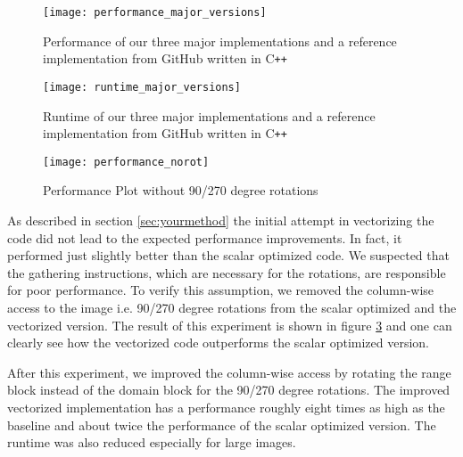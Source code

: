 \begin{figure}[H]
  \centering
  \texttt{[image: performance\_major\_versions]}
  \caption{Performance of our three major implementations and a reference
    implementation from GitHub written in C\texttt{++}}\label{fig:perf}
\end{figure}

\begin{figure}[H]
  \centering
  \texttt{[image: runtime\_major\_versions]}
  \caption{Runtime of our three major implementations and a reference
    implementation from GitHub written in C\texttt{++}}\label{fig:runtime}
\end{figure}

\begin{figure}[t]
  \centering
  \texttt{[image: performance\_norot]}
  \caption{Performance Plot without 90/270 degree rotations}\label{fig:perf_40_41}
\end{figure}

As described in section \ref{sec:yourmethod} the initial attempt in vectorizing
the code did not lead to the expected performance improvements. In fact, it
performed just slightly better than the scalar optimized code. We suspected that
the gathering instructions, which are necessary for the rotations, are
responsible for poor performance. To verify this assumption, we removed the
column-wise access to the image i.e. 90/270 degree rotations from the scalar
optimized and the vectorized version. The result of this experiment is shown in
figure \ref{fig:perf_40_41} and one can clearly see how the vectorized code
outperforms the scalar optimized version.

After this experiment, we improved the column-wise access by rotating the range
block instead of the domain block for the 90/270 degree rotations. The improved
vectorized implementation has a performance roughly eight times as high as the
baseline and about twice the performance of the scalar optimized version. The
runtime was also reduced especially for large images.
